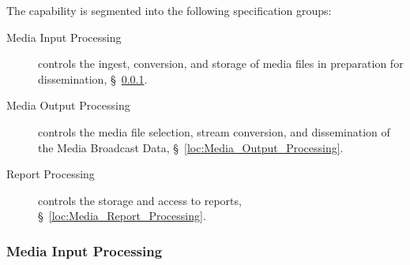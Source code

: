 The \ThisSys capability is segmented into the following specification groups:

\begin{description}
	\item [Media Input Processing] controls the ingest, conversion, and storage of media files in preparation for dissemination, \S~\ref{loc:Media_Input_Processing}.
	\item [Media Output Processing] controls the media file selection, stream conversion, and dissemination of the Media Broadcast Data, \S~\ref{loc:Media_Output_Processing}.
	\item [Report Processing] controls the storage and access to \ThisSys reports, \S~\ref{loc:Media_Report_Processing}.
\end{description}


\KNEADSUBSUBSECTIONNEWPAGE
%
%

\subsubsection{Media Input Processing}
\label{loc:Media_Input_Processing}


